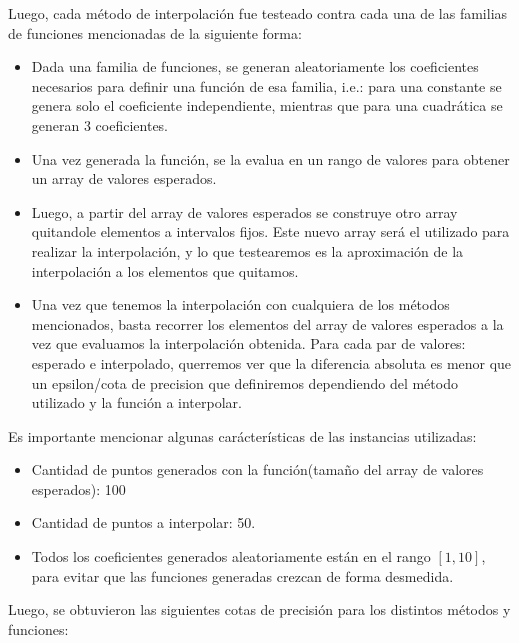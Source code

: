 Luego, cada método de interpolación fue testeado contra cada una de las familias de funciones mencionadas de la siguiente forma:
\begin{itemize}
  \item Dada una familia de funciones, se generan aleatoriamente los coeficientes necesarios para definir una función de esa familia, i.e.: para una constante se genera solo el coeficiente independiente, mientras que para una cuadrática se generan 3 coeficientes.
    \item Una vez generada la función, se la evalua en un rango de valores para obtener un array de valores esperados.
    \item Luego, a partir del array de valores esperados se construye otro array quitandole elementos a intervalos fijos.
        Este nuevo array será el utilizado para realizar la interpolación, y lo que testearemos es la aproximación de  la
        interpolación a los elementos que quitamos.
    \item Una vez que tenemos la interpolación con cualquiera de los métodos mencionados, basta recorrer los elementos del array de valores esperados a la vez que evaluamos la interpolación obtenida.
        Para cada par de valores: esperado e interpolado, querremos ver que la diferencia absoluta es menor que un epsilon/cota de precision que
        definiremos dependiendo del método utilizado y la función a interpolar.
\end{itemize}

Es importante mencionar algunas carácterísticas de las instancias utilizadas:
\begin{itemize}
    \item Cantidad de puntos generados con la función(tamaño del array de valores esperados): 100
    \item Cantidad de puntos a interpolar: 50.
    \item Todos los coeficientes generados aleatoriamente están en el rango $[1,10]$,
        para evitar que las funciones generadas crezcan de forma desmedida.
\end{itemize}

Luego, se obtuvieron las siguientes cotas de precisión para los distintos métodos y funciones:

